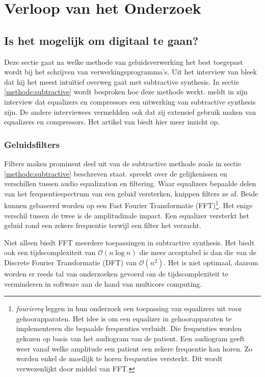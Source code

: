 \chapter{Verloop van het Onderzoek}
\label{ch:onderzoek}

\section{Is het mogelijk om digitaal te gaan?}
\label{onderzoeksvraag1}

Deze sectie gaat na welke methode van geluidsverwerking het best toegepast wordt bij het schrijven van verwerkingsprogramma's. Uit het interview van \textcite{thomashouthave} bleek dat hij het meest intuïtief overweg gaat met subtractive synthesis. In sectie \ref{methode:subtractive} wordt besproken hoe deze methode werkt. \textcite{thomashouthave} meldt in zijn interview dat equalizers en compressors een uitwerking van subtractive synthesis zijn. De andere interviewees vermeldden ook dat zij extensief gebruik maken van equalizers en compressors. Het artikel van \textcite{filtervseq} biedt hier meer inzicht op.

\subsection{Geluidsfilters}

Filters maken prominent deel uit van de subtractive methode zoals in sectie \ref{methode:subtractive} beschreven staat. \textcite{filtervseq} spreekt over de gelijkenissen en verschillen tussen audio equalization en filtering. Waar equalizers bepaalde delen van het frequentiespectrum van een geluid versterken, knippen filters ze af. Beide kunnen gebaseerd worden op een Fast Fourier Transformatie (FFT)\footnote{\textit{fouriereq} leggen in hun onderzoek een toepassing van equalizers uit voor gehoorapparaten. Het idee is om een equalizer in gehoorapparaten te implementeren die bepaalde frequenties verluidt. Die frequenties worden gekozen op basis van het audiogram van de patient. Een audiogram geeft weer vanaf welke amplitude een patient een zekere frequentie kan horen. Zo worden enkel de moeilijk te horen frequenties versterkt. Dit wordt verwezenlijkt door middel van FFT.}. Het enige verschil tussen de twee is de amplitudinale impact. Een equalizer versterkt het geluid rond een zekere frequentie terwijl een filter het verzacht.

Niet alleen biedt FFT meerdere toepassingen in subtractive synthesis. Het biedt ook een tijdscomplexiteit van $\mathcal{O}(n\log{}n)$ die meer acceptabel is dan die van de Discrete Fourier Transformatie (DFT) van $\mathcal{O}(n^2)$.\autocite{ffttime} Het is niet optimaal, daarom worden er reeds tal van onderzoeken gevoerd om de tijdscomplexiteit te verminderen in software aan de hand van multicore computing. \autocite{robbievincke}

